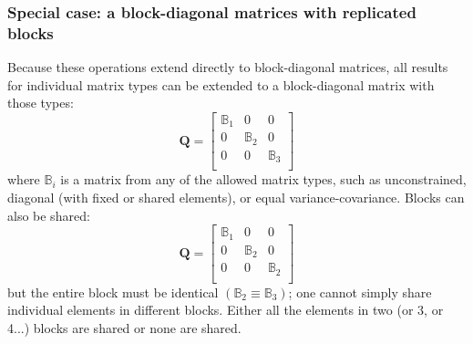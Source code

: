 \documentclass[]{article}
\def\QQ{\mbox{$\mathbf Q$}}	 \def\qq{\mbox{$\mathbf q$}}
\begin{document}
\subsubsection{Special case: a block-diagonal matrices with replicated blocks}
\label{sec:Q.block.diagonal}
Because these operations extend directly to block-diagonal matrices, all results for individual matrix types can be extended to a block-diagonal matrix with those types:
\begin{equation*}
\QQ=
\begin{bmatrix}
\mathbb{B}_1&0&0\\
0&\mathbb{B}_2&0\\
0&0&\mathbb{B}_3\\
\end{bmatrix}
\end{equation*}
where $\mathbb{B}_i$ is a matrix from any of the allowed matrix types, such as unconstrained, diagonal (with fixed or shared elements), or equal variance-covariance.   Blocks can also be shared:
\begin{equation*}\QQ=
\begin{bmatrix}
\mathbb{B}_1&0&0\\
0&\mathbb{B}_2&0\\
0&0&\mathbb{B}_2\\
\end{bmatrix}
\end{equation*}
but the entire block must be identical $(\mathbb{B}_2 \equiv \mathbb{B}_3)$; one cannot simply share individual elements in different blocks.  Either all the elements in two (or 3, or 4...) blocks are shared or none are shared. 
\end{document}
